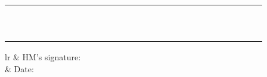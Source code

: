 \documentclass[12pt]{article}
\begin{document}
\begin{longtable}{|l|p{3.0cm}|p{3.0cm}|p{3.0cm}|l|p{2cm}|l|l|l|l|l|l|l|l|l|l|l|l|l|l|l|l|l|l|l|l|l|}
 & \relax & \relax & \relax & \relax & \relax & \relax & \relax & & & & & & & & & & & & & & & & & & \\ \hline
 & \relax & \relax & \relax & \relax & \relax & \relax & \relax & & & & & & & & & & & & & & & & & & \\ \hline
 & \relax & \relax & \relax & \relax & \relax & \relax & \relax & & & & & & & & & & & & & & & & & & \\ \hline
 & \relax & \relax & \relax & \relax & \relax & \relax & \relax & & & & & & & & & & & & & & & & & & \\ \hline
 & \relax & \relax & \relax & \relax & \relax & \relax & \relax & & & & & & & & & & & & & & & & & & \\ \hline
 & \relax & \relax & \relax & \relax & \relax & \relax & \relax & & & & & & & & & & & & & & & & & & \\ \hline
 & \relax & \relax & \relax & \relax & \relax & \relax & \relax & & & & & & & & & & & & & & & & & & \\ \hline
 & \relax & \relax & \relax & \relax & \relax & \relax & \relax & & & & & & & & & & & & & & & & & & \\ \hline
 & \relax & \relax & \relax & \relax & \relax & \relax & \relax & & & & & & & & & & & & & & & & & & \\ \hline
 & \relax & \relax & \relax & \relax & \relax & \relax & \relax & & & & & & & & & & & & & & & & & & \\ \hline
 & \relax & \relax & \relax & \relax & \relax & \relax & \relax & & & & & & & & & & & & & & & & & & \\ \hline
\end{longtable}



    \begin{tabular}{lr}
     & HM's signature: \\
    & Date:
    \end{tabular}
  
\end{document}
